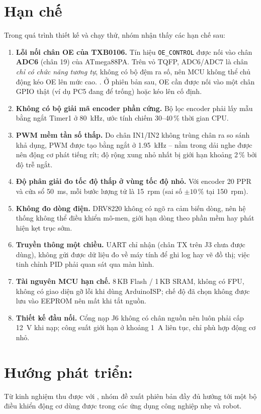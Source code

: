 \section{Hạn chế}
\label{sec:hanche}
Trong quá trình thiết kế và chạy thử, nhóm nhận thấy các hạn chế sau:
\begin{enumerate}
  \item \textbf{Lỗi nối chân OE của TXB0106.} Tín hiệu \texttt{OE\_CONTROL} được nối vào chân \textbf{ADC6} (chân 19) của ATmega88PA. Trên vỏ TQFP, ADC6/ADC7 là chân \emph{chỉ có chức năng tương tự}, không có bộ đệm ra số, nên MCU không thể chủ động kéo OE lên mức cao. . Ở phiên bản sau, OE cần được nối vào một chân GPIO thật (ví dụ PC5 đang để trống) hoặc kéo lên cố định.
  \item \textbf{Không có bộ giải mã encoder phần cứng.} Bộ lọc encoder phải lấy mẫu bằng ngắt Timer1 ở \SI{80}{\kilo\hertz}, ước tính chiếm 30--40\,\% thời gian CPU.
  \item \textbf{PWM mềm tần số thấp.} Do chân IN1/IN2 không trùng chân ra so sánh khả dụng, PWM được tạo bằng ngắt ở \SI{1.95}{\kilo\hertz} -- nằm trong dải nghe được nên động cơ phát tiếng rít; độ rộng xung nhỏ nhất bị giới hạn khoảng 2\,\% bởi độ trễ ngắt.
  \item \textbf{Độ phân giải đo tốc độ thấp ở vùng tốc độ nhỏ.} Với encoder 20 PPR và cửa sổ \SI{50}{\milli\second}, mỗi bước lượng tử là \SI{15}{rpm} (sai số $\pm10\,\%$ tại \SI{150}{rpm}).
  \item \textbf{Không đo dòng điện.} DRV8220 không có ngõ ra cảm biến dòng, nên hệ thống không thể điều khiển mô-men, giới hạn dòng theo phần mềm hay phát hiện kẹt trục sớm.
  \item \textbf{Truyền thông một chiều.} UART chỉ nhận (chân TX trên J3 chưa được dùng), không gửi được dữ liệu đo về máy tính để ghi log hay vẽ đồ thị; việc tinh chỉnh PID phải quan sát qua màn hình.
  \item \textbf{Tài nguyên MCU hạn chế.} 8\,KB Flash / 1\,KB SRAM, không có FPU, không có giao diện gỡ lỗi khi dùng ArduinoISP; chế độ đã chọn không được lưu vào EEPROM nên mất khi tắt nguồn.
  \item \textbf{Thiết kế đầu nối.} Cổng nạp J6 không có chân nguồn nên luôn phải cấp \SI{12}{\volt} khi nạp; công suất giới hạn ở khoảng \SI{1}{\ampere} liên tục, chỉ phù hợp động cơ nhỏ.
\end{enumerate}

\section{Hướng phát triển: \projpro}
Từ kinh nghiệm thu được với \proj, nhóm đề xuất phiên bản đầy đủ \textbf{\projpro} hướng tới một bộ điều khiển động cơ dùng được trong các ứng dụng công nghiệp nhẹ và robot.

